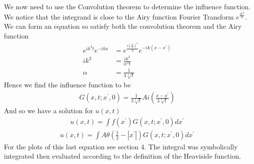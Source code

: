 \documentclass{article}
\begin{document}
We now need to use the Convolution theorem to determine the influence function. We notice that the integrand is close to the Airy function Fourier Transform $e^{\frac{ik^3}{3}}$. We can form an equation so satisfy both the convolution theorem and the Airy function
\begin{align*}
e^{ik^3t}e^{-ikx} &= e^{\frac{i(\frac{k}{\alpha})^3}{3}}e^{-ik(x-x^\prime)} \\
ik^3 &= \frac{ik^3}{\alpha^3 t} \\
\alpha &= \frac{1}{3\sqrt[3]{t}}
\end{align*}
Hence we find the influence function to be
\begin{align*}
G(x,t;x^\prime, 0) = \frac{1}{3\sqrt[3]{t}}Ai\left(\frac{x-x^\prime}{3\sqrt[3]{t}}\right)
\end{align*}
And so we have a solution for $u(x,t)$
\begin{align*}
u(x,t) = \int f(x^\prime)G(x,t;x^\prime, 0) dx^\prime
\end{align*}
\begin{align*}
u(x,t) = \int A \theta(\frac{1}{2}- |x^\prime|) G(x,t;x^\prime, 0) dx^\prime
\end{align*}
For the plots of this last equation see section 4. The integral was symbolically integrated then evaluated according to the definition of the Heaviside function. 
\end{document}
